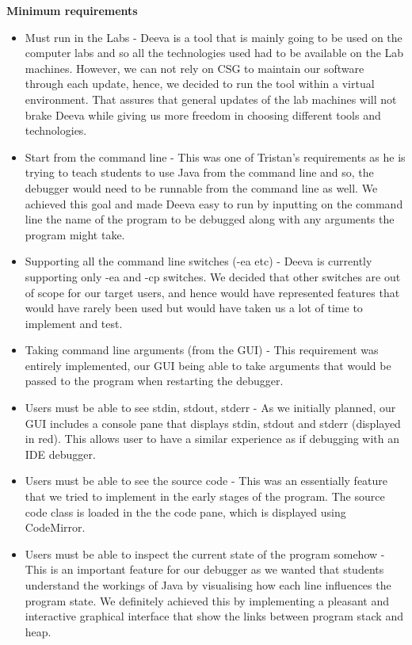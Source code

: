 \documentclass[11pt, a4paper]{article}
\begin{document}
\textbf{Minimum requirements}
\begin{itemize}
\item Must run in the Labs - Deeva is a tool that is mainly going to be used on the computer labs and so all the technologies used had to be available on the Lab machines. However, we can not rely on CSG to maintain our software through each update, hence, we decided to run the tool within a virtual environment. That assures that general updates of the lab machines will not brake Deeva while giving us more freedom in choosing different tools and technologies.
\item Start from the command line - This was one of Tristan's requirements as he is trying to teach students to use Java from the command line and so, the debugger would need to be runnable from the command line as well. We achieved this goal and made Deeva easy to run by inputting on the command line the name of the program to be debugged along with any arguments the program might take.
\item Supporting all the command line switches (-ea etc) - Deeva is currently supporting only -ea and -cp switches. We decided that other switches are out of scope for our target users, and hence would have represented features that would have rarely been used but would have taken us a lot of time to implement and test.
\item Taking command line arguments (from the GUI) - This requirement was entirely implemented, our GUI being able to take arguments that would be passed to the program when restarting the debugger.
\item Users must be able to see stdin, stdout, stderr - As we initially planned, our GUI includes a console pane that displays stdin, stdout and stderr (displayed in red). This allows user to have a similar experience as if debugging with an IDE debugger.
\item Users must be able to see the source code - This was an essentially feature that we tried to implement in the early stages of the program. The source code class is loaded in the the code pane, which is displayed using CodeMirror.
\item Users must be able to inspect the current state of the program somehow - This is an important feature for our debugger as we wanted that students understand the workings of Java by visualising how each line influences the program state. We definitely achieved this by implementing a pleasant and interactive graphical interface that show the links between program stack and heap.

\end{itemize}
\end{document}
